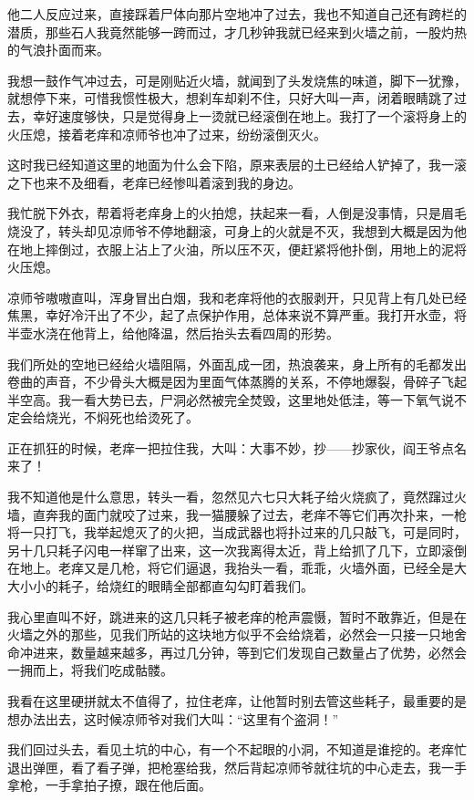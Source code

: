他二人反应过来，直接踩着尸体向那片空地冲了过去，我也不知道自己还有跨栏的潜质，那些石人我竟然能够一跨而过，才几秒钟我就已经来到火墙之前，一股灼热的气浪扑面而来。

我想一鼓作气冲过去，可是刚贴近火墙，就闻到了头发烧焦的味道，脚下一犹豫，就想停下来，可惜我惯性极大，想刹车却刹不住，只好大叫一声，闭着眼睛跳了过去，幸好速度够快，只是觉得身上一烫就已经滚倒在地上。我打了一个滚将身上的火压熄，接着老痒和凉师爷也冲了过来，纷纷滚倒灭火。

这时我已经知道这里的地面为什么会下陷，原来表层的土已经给人铲掉了，我一滚之下也来不及细看，老痒已经惨叫着滚到我的身边。

我忙脱下外衣，帮着将老痒身上的火拍熄，扶起来一看，人倒是没事情，只是眉毛烧没了，转头却见凉师爷不停地翻滚，可身上的火就是不灭，我想到大概是因为他在地上摔倒过，衣服上沾上了火油，所以压不灭，便赶紧将他扑倒，用地上的泥将火压熄。

凉师爷嗷嗷直叫，浑身冒出白烟，我和老痒将他的衣服剥开，只见背上有几处已经焦黑，幸好冷汗出了不少，起了点保护作用，总体来说不算严重。我打开水壶，将半壶水浇在他背上，给他降温，然后抬头去看四周的形势。

我们所处的空地已经给火墙阻隔，外面乱成一团，热浪袭来，身上所有的毛都发出卷曲的声音，不少骨头大概是因为里面气体蒸腾的关系，不停地爆裂，骨碎子飞起半空高。我一看大势已去，尸洞必然被完全焚毁，这里地处低洼，等一下氧气说不定会给烧光，不焖死也给烫死了。

正在抓狂的时候，老痒一把拉住我，大叫：大事不妙，抄——抄家伙，阎王爷点名来了！

我不知道他是什么意思，转头一看，忽然见六七只大耗子给火烧疯了，竟然蹿过火墙，直奔我的面门就咬了过来，我一猫腰躲了过去，老痒不等它们再次扑来，一枪将一只打飞，我举起熄灭了的火把，当成武器也将扑过来的几只敲飞，可是同时，另十几只耗子闪电一样窜了出来，这一次我离得太近，背上给抓了几下，立即滚倒在地上。老痒又是几枪，将它们逼退，我抬头一看，乖乖，火墙外面，已经全是大大小小的耗子，给烧红的眼睛全部都直勾勾盯着我们。

我心里直叫不好，跳进来的这几只耗子被老痒的枪声震慑，暂时不敢靠近，但是在火墙之外的那些，见我们所站的这块地方似乎不会给烧着，必然会一只接一只地舍命冲进来，数量越来越多，再过几分钟，等到它们发现自己数量占了优势，必然会一拥而上，将我们吃成骷髅。

我看在这里硬拼就太不值得了，拉住老痒，让他暂时别去管这些耗子，最重要的是想办法出去，这时候凉师爷对我们大叫：“这里有个盗洞！”

我们回过头去，看见土坑的中心，有一个不起眼的小洞，不知道是谁挖的。老痒忙退出弹匣，看了看子弹，把枪塞给我，然后背起凉师爷就往坑的中心走去，我一手拿枪，一手拿拍子撩，跟在他后面。

